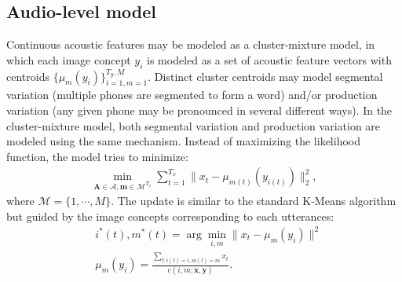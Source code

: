 \documentclass[journal]{IEEEtran}
\begin{document}
\subsection{Audio-level model}
Continuous acoustic features may be modeled as a cluster-mixture model, in which each image concept $y_i$ is modeled as a set of acoustic feature vectors with centroids $\{\mu_m(y_i)\}_{i=1, m=1}^{T_y, M}$. Distinct cluster centroids may model segmental variation (multiple phones are segmented to form a word) and/or production variation (any  given phone may be pronounced in several different ways). In the cluster-mixture model, both segmental variation and production variation are modeled using the same mechanism.
Instead of maximizing the likelihood function, the model tries to minimize:
\begin{align}\label{eq:multimodal_kmeans_obj}
    \min_{\mathbf A \in \mathcal A, \mathbf m \in \mathcal M^{T_x}} \sum_{t=1}^{T_x} \|x_t - \mu_{m(t)}(y_{i(t)})\|^2_2,
\end{align}
where $\mathcal M = \{1, \cdots, M\}$. The update is similar to the standard K-Means algorithm but guided by the image concepts corresponding to each utterances:
\begin{align}\label{eq:multimodal_kmeans_update}
    &i^*(t), m^*(t) = \arg\min_{i, m}\|x_t - \mu_m(y_{i})\|^2\\
    &\mu_m(y_i) = \frac{\sum_{t: i(t)=i, m(t)=m} x_t}{c(i, m;\mathbf x, \mathbf y)}.
\end{align}


\end{document}
